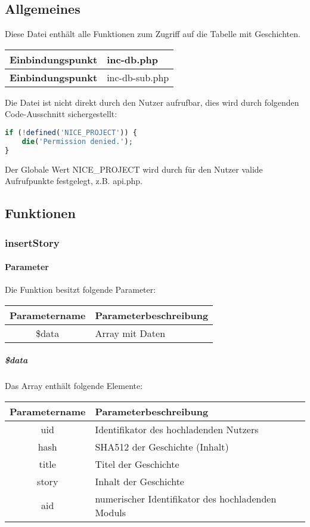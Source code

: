 \subsection{Allgemeines} Diese Datei enthält alle Funktionen zum Zugriff auf die Tabelle mit Geschichten.
\begin{table}[H]
	\begin{tabular}{|c|p{11cm}|}
		\hline
		\textbf{Einbindungspunkt} & inc-db.php \\ \hline
		\textbf{Einbindungspunkt} & inc-db-sub.php \\ \hline
	\end{tabular}
\end{table}
Die Datei ist nicht direkt durch den Nutzer aufrufbar, dies wird durch folgenden Code-Ausschnitt sichergestellt:
\begin{lstlisting}[language=php]
if (!defined('NICE_PROJECT')) {
	die('Permission denied.');
}
\end{lstlisting}
Der Globale Wert {\glqq NICE\_PROJECT\grqq} wird durch für den Nutzer valide Aufrufpunkte festgelegt, z.B. {\glqq api.php\grqq}.
\newpage
\subsection{Funktionen}
\subsubsection{insertStory}
\paragraph{Parameter} Die Funktion besitzt folgende Parameter:
\begin{table}[H]
	\begin{tabular}{|c|p{11cm}|}
		\hline
		\textbf{Parametername} & \textbf{Parameterbeschreibung} \\ \hline
		\$data & Array mit Daten \\ \hline
	\end{tabular}
\end{table}
\subparagraph{\$data}Das Array enthält folgende Elemente:
\begin{table}[H]
	\begin{tabular}{|c|p{11cm}|}
		\hline
		\textbf{Parametername} & \textbf{Parameterbeschreibung} \\ \hline
		uid   & Identifikator des hochladenden Nutzers \\ \hline
		hash  & SHA512 der Geschichte (Inhalt) \\ \hline
		title & Titel der Geschichte \\ \hline
		story & Inhalt der Geschichte \\ \hline
		aid   & numerischer Identifikator des hochladenden Moduls \\ \hline
	\end{tabular}
\end{table}
